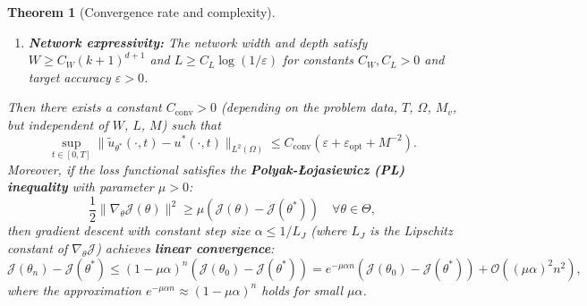 \documentclass[11pt,reqno]{amsart}
\theoremstyle{plain}
\newtheorem{theorem}{Theorem}[section]
\theoremstyle{definition}
\theoremstyle{remark}
\begin{document}
\begin{theorem}[Convergence rate and complexity]
\begin{enumerate}[label=(\roman*)]
    \item \textbf{Network expressivity:} The network width and depth satisfy $W \geq C_W (k+1)^{d+1}$ and $L \geq C_L \log(1/\varepsilon)$ for constants $C_W, C_L > 0$ and target accuracy $\varepsilon > 0$.
\end{enumerate}
Then there exists a constant $C_{\mathrm{conv}} > 0$ (depending on the problem data, $T$, $\Omega$, $M_v$, but independent of $W$, $L$, $M$) such that
\begin{equation}\label{eq:convergence_rate}
    \sup_{t \in [0,T]} \|\tilde{u}_{\theta^*}(\cdot, t) - u^*(\cdot, t)\|_{L^2(\Omega)} \leq C_{\mathrm{conv}} \left( \varepsilon + \varepsilon_{\mathrm{opt}} + M^{-2} \right).
\end{equation}
Moreover, if the loss functional satisfies the \textbf{Polyak-Łojasiewicz (PL) inequality} with parameter $\mu > 0$:
\begin{equation}\label{eq:PL_inequality}
    \frac{1}{2} \|\nabla_\theta \mathcal{J}(\theta)\|^2 \geq \mu \left( \mathcal{J}(\theta) - \mathcal{J}(\theta^*) \right) \quad \forall \theta \in \Theta,
\end{equation}
then gradient descent with constant step size $\alpha \leq 1/L_J$ (where $L_J$ is the Lipschitz constant of $\nabla_\theta \mathcal{J}$) achieves \textbf{linear convergence}:
\begin{equation}\label{eq:linear_convergence}
    \mathcal{J}(\theta_n) - \mathcal{J}(\theta^*) \leq \left(1 - \mu\alpha\right)^n \left( \mathcal{J}(\theta_0) - \mathcal{J}(\theta^*) \right) = e^{-\mu \alpha n} \left( \mathcal{J}(\theta_0) - \mathcal{J}(\theta^*) \right) + \mathcal{O}((\mu\alpha)^2 n^2),
\end{equation}
where the approximation $e^{-\mu\alpha n} \approx (1 - \mu\alpha)^n$ holds for small $\mu\alpha$.
\end{theorem}
\end{document}
